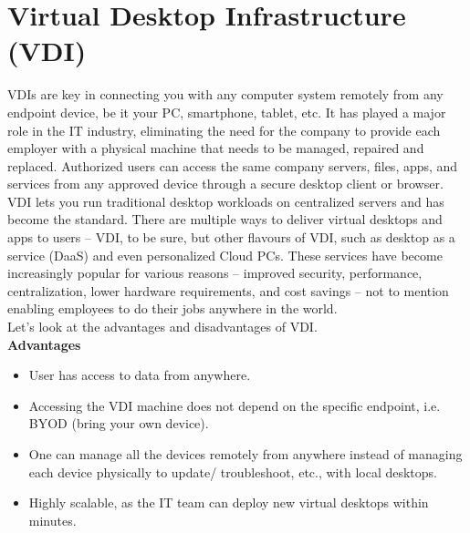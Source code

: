 \documentclass[a4paper,12pt, final]{report}
\begin{document}


\chapter{Virtual Desktop Infrastructure (VDI)} %

VDIs are key in connecting you with any computer system remotely from any endpoint device, be it your PC, smartphone, tablet, etc. It has played a major role in the IT industry, eliminating the need for the company to provide each employer with a physical machine that needs to be managed, repaired and replaced. Authorized users can access the same company servers, files, apps, and services from any approved device through a secure desktop client or browser.\\

\noindent VDI lets you run traditional desktop workloads on centralized servers and has become the standard. There are multiple ways to deliver virtual desktops and apps to users -- VDI, to be sure, but other flavours of VDI, such as desktop as a service (DaaS) and even personalized Cloud PCs. These services have become increasingly popular for various reasons -- improved security, performance, centralization, lower hardware requirements, and cost savings -- not to mention enabling employees to do their jobs anywhere in the world.\\

\noindent Let's look at the advantages and disadvantages of VDI.\\

\noindent \textbf{Advantages}
\begin{itemize}
    \item User has access to data from anywhere.
    \item Accessing the VDI machine does not depend on the specific endpoint, i.e. BYOD (bring your own device).
    \item One can manage all the devices remotely from anywhere instead of managing each device physically to update/ troubleshoot, etc., with local desktops.
    \item Highly scalable, as the IT team can deploy new virtual desktops within minutes.
\end{itemize}
\end{document}
